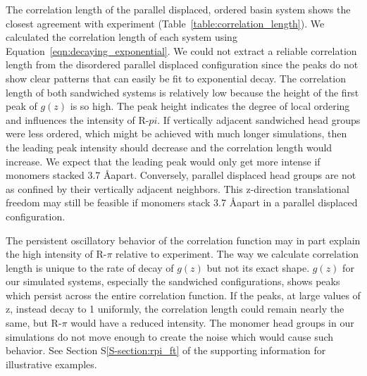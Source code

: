 \documentclass[journal=jpcbfk,manusciprt=article]{achemso}
\begin{document}

  The correlation length of the parallel displaced, ordered basin system shows
  the closest agreement with experiment (Table~\ref{table:correlation_length}). We calculated the 
  correlation length of each system using Equation~\ref{eqn:decaying_exponential}. We could
  not extract a reliable correlation length from the disordered parallel displaced configuration
  since the peaks do not show clear patterns that can easily be fit to exponential decay. The 
  correlation length of both sandwiched systems is relatively low because the height of the first
  peak of $g(z)$ is so high. The peak height indicates the degree of local ordering and influences
  the intensity of R-$pi$. If vertically adjacent sandwiched head groups were less ordered, which
  might be achieved with much longer simulations, then the leading peak intensity should decrease and
  the correlation length would increase. We expect that the leading peak would only get more intense 
  if monomers stacked 3.7 \AA apart. Conversely, parallel displaced head groups are not as confined
  by their vertically adjacent neighbors. This z-direction translational freedom may still be 
  feasible if monomers stack 3.7 \AA apart in a parallel displaced configuration.
  
  
  The persistent oscillatory behavior of the correlation function may in part explain the high
  intensity of R-$\pi$ relative to experiment. The way we calculate correlation length is
  unique to the rate of decay of $g(z)$ but not its exact shape. $g(z)$ for our 
  simulated systems, especially the sandwiched configurations, shows peaks which persist across
  the entire correlation function. If the peaks, at large values of z, instead decay to 1 uniformly,
  the correlation length could remain nearly the same, but R-$\pi$ would have a reduced intensity. 
  The monomer head groups in our simulations do not move enough to create the noise which would 
  cause such behavior. See Section S\ref{S-section:rpi_ft} of the supporting information for
  illustrative examples.
  
\end{document}
